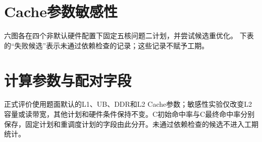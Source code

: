 \section{Cache参数敏感性}\label{app:sensitivity}
六图各在四个非默认硬件配置下固定五核问题二计划，并尝试候选重优化。
下表的“失败候选”表示未通过依赖检查的记录；这些记录不赋予工期。
\begingroup
\small
\setlength{\tabcolsep}{4.5pt}
\renewcommand{\arraystretch}{0.94}
\setlength{\LTleft}{\fill}\setlength{\LTright}{\fill}

\endgroup

\section{计算参数与配对字段}
正式评价使用题面默认的L1、UB、DDR和L2 Cache参数；敏感性实验仅改变L2容量或读带宽，其他计划和硬件条件保持不变。C初始命中率与C最终命中率分别保存，固定计划和重调度计划的字段由此分开。未通过依赖检查的候选不进入工期统计。
